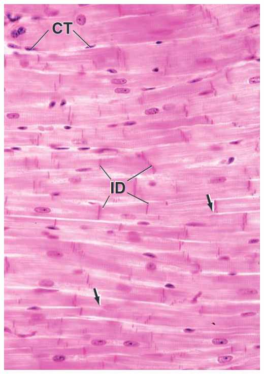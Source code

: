 \begin{itemize}
\begin{itemize}
    \end{itemize}
  \begin{center}
    \includegraphics[scale=0.18]{images/week-1-rp7.png}

\end{center}
\end{itemize}
